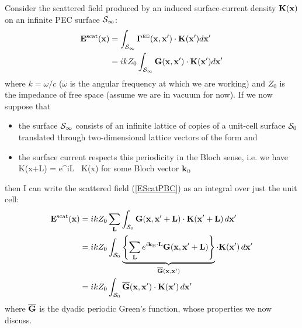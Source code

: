Consider the scattered field produced by an 
induced surface-current density $\mathbf{K}(\mathbf{x})$ on
an infinite PEC surface $\mathcal{S}_\infty$:
\begin{align}
  \mathbf{E}^{\hbox{\scriptsize{scat}}}(\mathbf{x})
&=
  \int_{\mathcal{S}_\infty} 
   \boldsymbol{\Gamma}^{\hbox{\tiny{EE}}}(\mathbf{x}, \mathbf{x}^\prime)
   \cdot 
   \mathbf{K}(\mathbf{x}^\prime)d\mathbf{x}^\prime
\\
&=
  ikZ_0
  \int_{\mathcal{S}_\infty} 
   \mathbf{G}(\mathbf{x}, \mathbf{x}^\prime) 
   \cdot 
   \mathbf{K}(\mathbf{x}^\prime)d\mathbf{x}^\prime
\label{EScatPBC}
\end{align}
where $k=\omega/c$ ($\omega$ is the angular frequency
at which we are working) and $Z_0$ is the impedance
of free space (assume we are in vacuum for now).
If we now suppose that 
\begin{itemize}
 \item the surface $\mathcal{S}_\infty$ consists of an infinite lattice
       of copies of a unit-cell surface $\mathcal{S}_0$ translated through
       two-dimensional lattice vectors of the form 
       and
 \item the surface current respects this periodicity in the 
       Bloch sense, i.e. we have
       {\vb K(\vb x+\vb L)
          = e^{i\KB \cdot \vb L} \, \vb K(\vb x)
       }
       for some Bloch vector $\mathbf{k}_{\hbox{\tiny{B}}}$
\end{itemize}
then I can write the scattered field (\ref{EScatPBC}) as an integral
over just the unit cell:
\begin{align}
   \mathbf{E}^{\hbox{\scriptsize{scat}}}(\mathbf{x})
&= ikZ_0 
   \sum_{\mathbf{L}}
   \int_{\mathcal{S}_0}
   \mathbf{G}(\mathbf{x}, \mathbf{x}^\prime+\mathbf{L})
   \cdot 
   \mathbf{K}(\mathbf{x}^\prime + \mathbf{L} ) \, d\mathbf{x}^\prime
\nonumber \\
&= ikZ_0
   \int_{\mathcal{S}_0}
   \underbrace{
   \left\{
   \sum_{\mathbf{L}}
   e^{i\mathbf{k}_{\hbox{\tiny{B}}} \cdot \mathbf{L}}
   \mathbf{G}(\mathbf{x}, \mathbf{x}^\prime+\mathbf{L})
   \right\}
              }_{\overline{\mathbf{G}}(\mathbf{x}, \mathbf{x}^\prime)}
   \cdot 
   \mathbf{K}(\mathbf{x}^\prime) \, d\mathbf{x}^\prime
\nonumber \\
&= ikZ_0 
   \int_{\mathcal{S}_0}
   \overline{\mathbf{G}}(\mathbf{x}, \mathbf{x}^\prime)
   \cdot 
   \mathbf{K}(\mathbf{x}^\prime) \, d\mathbf{x}^\prime
\label{EScatPBC}
\end{align}
where $\overline{\mathbf{G}}$ is the dyadic periodic Green's function,
whose properties we now discuss.

